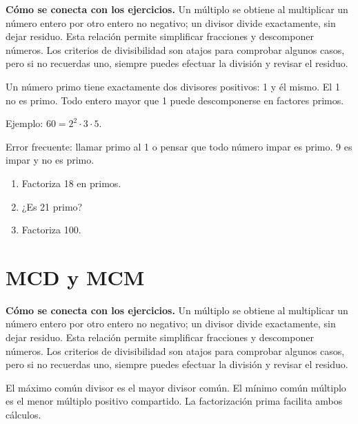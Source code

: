 \documentclass[10pt,oneside,openany]{book}
\begin{document}
\textbf{Cómo se conecta con los ejercicios.} Un múltiplo se obtiene al multiplicar un número entero por otro entero no negativo; un divisor divide exactamente, sin dejar residuo. Esta relación permite simplificar fracciones y descomponer números. Los criterios de divisibilidad son atajos para comprobar algunos casos, pero si no recuerdas uno, siempre puedes efectuar la división y revisar el residuo.

Un número primo tiene exactamente dos divisores positivos: 1 y él mismo. El 1 no es primo. Todo entero mayor que 1 puede descomponerse en factores primos.

\begin{ejemplo}
Ejemplo: $60=2^2\cdot3\cdot5$.
\end{ejemplo}

\begin{ojo}
Error frecuente: llamar primo al 1 o pensar que todo número impar es primo. 9 es impar y no es primo.
\end{ojo}

\begin{practica}

\begin{enumerate}

\item Factoriza 18 en primos.

\item ¿Es 21 primo?

\item Factoriza 100.

\end{enumerate}

\end{practica}



\section{MCD y MCM}

\textbf{Cómo se conecta con los ejercicios.} Un múltiplo se obtiene al multiplicar un número entero por otro entero no negativo; un divisor divide exactamente, sin dejar residuo. Esta relación permite simplificar fracciones y descomponer números. Los criterios de divisibilidad son atajos para comprobar algunos casos, pero si no recuerdas uno, siempre puedes efectuar la división y revisar el residuo.

El máximo común divisor es el mayor divisor común. El mínimo común múltiplo es el menor múltiplo positivo compartido. La factorización prima facilita ambos cálculos.
\end{document}
